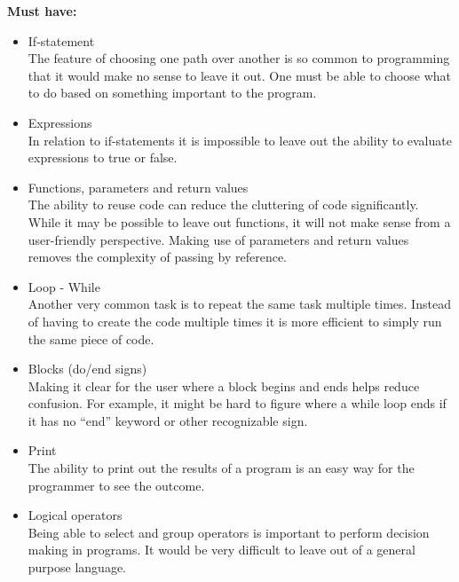 \textbf{Must have:}
\begin{itemize}
\item If-statement \\
The feature of choosing one path over another is so common to programming that it would make no sense to leave it out. One must be able to choose what to do based on something important to the program. \\

\item Expressions \\
In relation to if-statements it is impossible to leave out the ability to evaluate expressions to true or false. \\

\item Functions, parameters and return values \\
The ability to reuse code can reduce the cluttering of code significantly. While it may be possible to leave out functions, it will not make sense from a user-friendly perspective. Making use of parameters and return values removes the complexity of passing by reference. \\

\item Loop - While \\
Another very common task is to repeat the same task multiple times. Instead of having to create the code multiple times it is more efficient to simply run the same piece of code. \\

\item Blocks (do/end signs) \\
Making it clear for the user where a block begins and ends helps reduce confusion. For example, it might be hard to figure where a while loop ends if it has no ``end'' keyword or other recognizable sign. \\

\item Print \\
The ability to print out the results of a program is an easy way for the programmer to see the outcome. \\

\item Logical operators \\
Being able to select and group operators is important to perform decision making in programs. It would be very difficult to leave out of a general purpose language.\\


\end{itemize}
